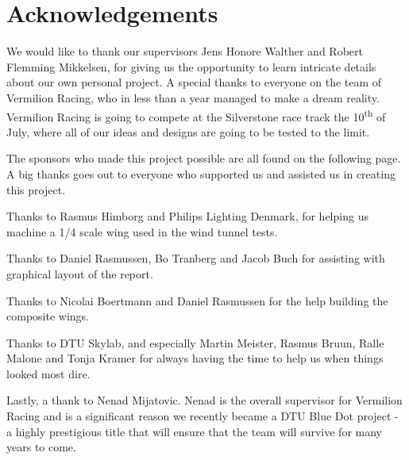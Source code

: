 \chapter*{Acknowledgements}

We would like to thank our supervisors Jens Honore Walther and Robert Flemming Mikkelsen, for giving us the opportunity to learn intricate details about our own personal project. A special thanks to everyone on the team of Vermilion Racing, who in less than a year managed to make a dream reality. Vermilion Racing is going to compete at the Silverstone race track the 10\textsuperscript{th} of July, where all of our ideas and designs are going to be tested to the limit.

The sponsors who made this project possible are all found on the following page. A big thanks goes out to everyone who supported us and assisted us in creating this project.

Thanks to Rasmus Himborg and Philips Lighting Denmark, for helping us machine a 1/4 scale wing used in the wind tunnel tests.

Thanks to Daniel Rasmussen, Bo Tranberg and Jacob Buch for assisting with graphical layout of the report.

Thanks to Nicolai Boertmann and Daniel Rasmussen for the help building the composite wings.

Thanks to DTU Skylab, and especially Martin Meister, Rasmus Bruun, Ralle Malone and Tonja Kramer for always having the time to help us when things looked most dire.

Lastly, a thank to Nenad Mijatovic. Nenad is the overall supervisor for Vermilion Racing and is a significant reason we recently became a DTU Blue Dot project - a highly prestigious title that will ensure that the team will survive for many years to come.

\begin{figure}
  \label{fig:sponsorstack}
\end{figure}

